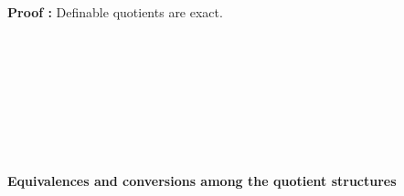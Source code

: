 \textbf{Proof :}\label{DQisExact} Definable quotients are exact.

\begin{code}\>\<%
\\
\>[0]\<[2]%
\>[2] \AgdaSymbol{:}  \AgdaSymbol{\}}  \AgdaFunction{[}  \AgdaFunction{]}  \AgdaFunction{[}  \AgdaFunction{]}   \AgdaFunction{\textasciitilde} \<%
\\
\>[0]\<[2]%
\>[2] \AgdaSymbol{\{}\AgdaSymbol{\}} \AgdaSymbol{\{}\AgdaSymbol{\}}  \AgdaSymbol{=} \<[20]%
\>[20]\<%
\\
\>[2]\<[4]%
\>[4] \AgdaSymbol{(} \AgdaSymbol{(} \AgdaSymbol{))} \<[33]%
\>[33]\<%
\\
\>[2]\<[4]%
\>[4]\AgdaSymbol{(} \AgdaSymbol{(}    \<[27]%
\>[27]\<%
\\
\>[2]\<[4]%
\>[4] \AgdaFunction{[}  \AgdaFunction{]} \AgdaFunction{\textasciitilde}  \AgdaSymbol{)} \<[23]%
\>[23]\<%
\\
\>[2]\<[4]%
\>[4] \AgdaSymbol{)} \AgdaSymbol{(} \AgdaSymbol{))}\<%
\\
\>\<\end{code}


\textbf{Equivalences and conversions among the quotient structures}

